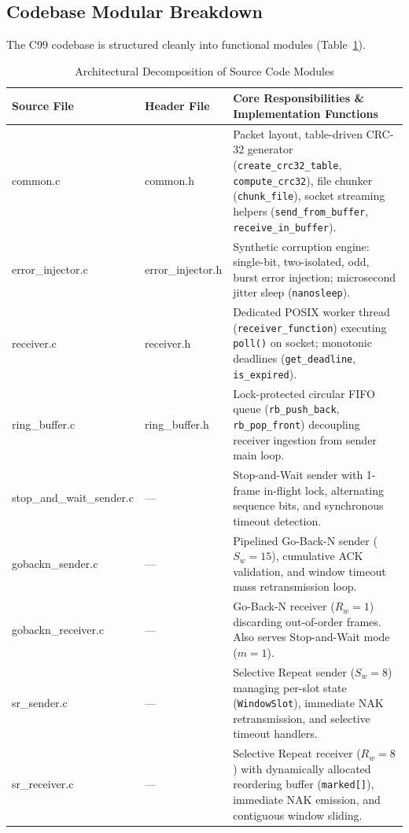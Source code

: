 \documentclass[11pt,a4paper]{article}
\begin{document}
\subsection{Codebase Modular Breakdown}
The C99 codebase is structured cleanly into functional modules (Table~\ref{tab:code_modules}).
\begin{table}[htbp]
\centering
\scriptsize
\renewcommand{\arraystretch}{1.15}
\begin{tabular}{>{\ttfamily\color{navyblue}}l l p{8.5cm}}
\rowcolor{tableheader}
\color{white}Source File & \color{white}Header File & \color{white}Core Responsibilities \& Implementation Functions \\
\hline
common.c & common.h & Packet layout, table-driven CRC-32 generator (\texttt{create\_crc32\_table}, \texttt{compute\_crc32}), file chunker (\texttt{chunk\_file}), socket streaming helpers (\texttt{send\_from\_buffer}, \texttt{receive\_in\_buffer}). \\
error\_injector.c & error\_injector.h & Synthetic corruption engine: single-bit, two-isolated, odd, burst error injection; microsecond jitter sleep (\texttt{nanosleep}). \\
receiver.c & receiver.h & Dedicated POSIX worker thread (\texttt{receiver\_function}) executing \texttt{poll()} on socket; monotonic deadlines (\texttt{get\_deadline}, \texttt{is\_expired}). \\
ring\_buffer.c & ring\_buffer.h & Lock-protected circular FIFO queue (\texttt{rb\_push\_back}, \texttt{rb\_pop\_front}) decoupling receiver ingestion from sender main loop. \\
stop\_and\_wait\_sender.c & --- & Stop-and-Wait sender with 1-frame in-flight lock, alternating sequence bits, and synchronous timeout detection. \\
gobackn\_sender.c & --- & Pipelined Go-Back-N sender ($S_w=15$), cumulative ACK validation, and window timeout mass retransmission loop. \\
gobackn\_receiver.c & --- & Go-Back-N receiver ($R_w=1$) discarding out-of-order frames. Also serves Stop-and-Wait mode ($m=1$). \\
sr\_sender.c & --- & Selective Repeat sender ($S_w=8$) managing per-slot state (\texttt{WindowSlot}), immediate NAK retransmission, and selective timeout handlers. \\
sr\_receiver.c & --- & Selective Repeat receiver ($R_w=8$) with dynamically allocated reordering buffer (\texttt{marked[]}), immediate NAK emission, and contiguous window sliding. \\
\bottomrule
\end{tabular}
\caption{Architectural Decomposition of Source Code Modules}
\label{tab:code_modules}
\end{table}
\end{document}
